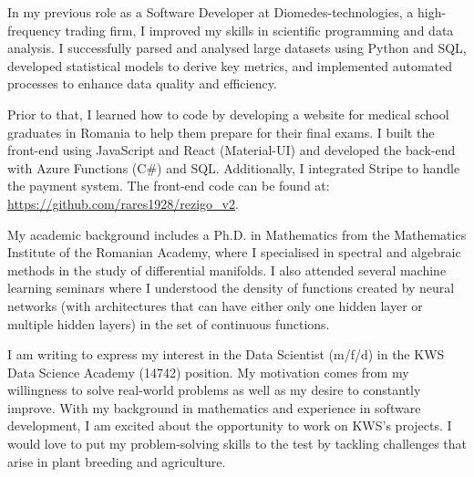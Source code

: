 \documentclass[11pt, a4paper]{awesome-cv}
\begin{document}
\makecvheader[R]

\makecvfooter
  {}
  {}
  {}

\makelettertitle

\begin{cvletter}

In my previous role as a Software Developer at Diomedes-technologies, a high-frequency trading firm, I improved my skills in scientific programming and data analysis. I successfully parsed and analysed large datasets using Python and SQL, developed statistical models to derive key metrics, and implemented automated processes to enhance data quality and efficiency.

Prior to that, I learned how to code by developing a website for medical school graduates in Romania to help them prepare for their final exams. I built the front-end using JavaScript and React (Material-UI) and developed the back-end with Azure Functions (C\#) and SQL. Additionally, I integrated Stripe to handle the payment system. The front-end code can be found at: \url{https://github.com/rares1928/rezigo_v2}.

My academic background includes a Ph.D. in Mathematics from the Mathematics Institute of the Romanian Academy, where I specialised in spectral and algebraic methods in the study of differential manifolds. I also attended several machine learning seminars where I understood the density of functions created by neural networks (with architectures that can have either only one hidden layer or multiple hidden layers) in the set of continuous functions.


I am writing to express my interest in the Data Scientist (m/f/d) in the KWS Data Science Academy (14742) position. My motivation comes from my willingness to solve real-world problems as well as my desire to constantly improve. With my background in mathematics and experience in software development, I am excited about the opportunity to work on KWS's projects. I would love to put my problem-solving skills to the test by tackling challenges that arise in plant breeding and agriculture.


\end{cvletter}
\end{document}

